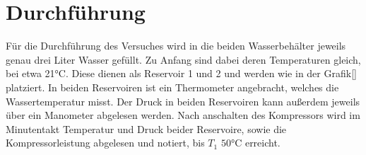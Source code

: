 \section{Durchführung}
\label{sec:Durchführung}

Für die Durchführung des Versuches wird in die beiden Wasserbehälter jeweils genau drei Liter Wasser gefüllt. Zu Anfang 
sind dabei deren Temperaturen gleich, bei etwa 21$\si{\celsius}$.
Diese dienen als Reservoir 1 und 2 und werden wie in der Grafik[] platziert. In beiden Reservoiren ist ein Thermometer
angebracht, welches die Wassertemperatur misst. Der Druck in beiden Reservoiren kann außerdem jeweils über ein Manometer
abgelesen werden. Nach anschalten des Kompressors wird im Minutentakt Temperatur und Druck beider Reservoire, sowie 
die Kompressorleistung abgelesen und notiert, bis $T_1$ $50\si{\celsius}$ erreicht. 
